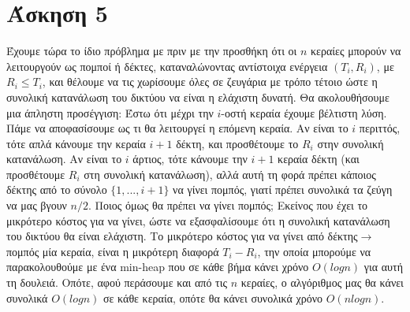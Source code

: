 \documentclass[12pt,a4paper]{article}
\begin{document}
  \section{Άσκηση 5}
    Έχουμε τώρα το ίδιο πρόβλημα με πριν με την προσθήκη ότι οι $n$ κεραίες 
    μπορούν να  λειτουργούν ως πομποί ή δέκτες, καταναλώνοντας αντίστοιχα 
    ενέργεια \( (T_i,R_i) \), με \( R_i \le T_i \), και θέλουμε να τις χωρίσουμε όλες σε
    ζευγάρια με τρόπο τέτοιο ώστε η συνολική κατανάλωση του δικτύου να είναι η 
    ελάχιστη δυνατή. Θα ακολουθήσουμε μια άπληστη προσέγγιση: Έστω ότι μέχρι 
    την \( i \)-οστή κεραία έχουμε βέλτιστη λύση. Πάμε να αποφασίσουμε ως τι θα 
    λειτουργεί η επόμενη κεραία. Αν είναι το \( i \) περιττός, τότε απλά κάνουμε 
    την κεραία \( i + 1 \) δέκτη, και προσθέτουμε το \( R_i \) στην συνολική κατανάλωση. 
    Αν είναι το \( i \) άρτιος, τότε κάνουμε την \( i + 1 \) κεραία δέκτη (και 
    προσθέτουμε \( R_i \) στη συνολική κατανάλωση), αλλά αυτή τη φορά πρέπει 
    κάποιος δέκτης από το σύνολο $\{1,...,i+1\}$ να γίνει πομπός, γιατί πρέπει 
    συνολικά τα ζεύγη να μας βγουν $n/2$. Ποιος όμως θα πρέπει να γίνει πομπός;
    Εκείνος που έχει το μικρότερο κόστος για να γίνει, ώστε να εξασφαλίσουμε ότι
    η συνολική κατανάλωση του δικτύου θα είναι ελάχιστη. Το μικρότερο κόστος για
    να γίνει από δέκτης$\rightarrow$πομπός μία κεραία, είναι η μικρότερη διαφορά
    $T_i - R_i$, την οποία μπορούμε να παρακολουθούμε με ένα min-heap που σε 
    κάθε βήμα κάνει χρόνο $O(logn)$ για αυτή τη δουλειά. Οπότε, αφού περάσουμε 
    και από τις $n$ κεραίες, ο αλγόριθμος μας θα κάνει συνολικά $O(logn)$ σε 
    κάθε κεραία, οπότε θα κάνει συνολικά χρόνο $O(nlogn)$.
\end{document}
